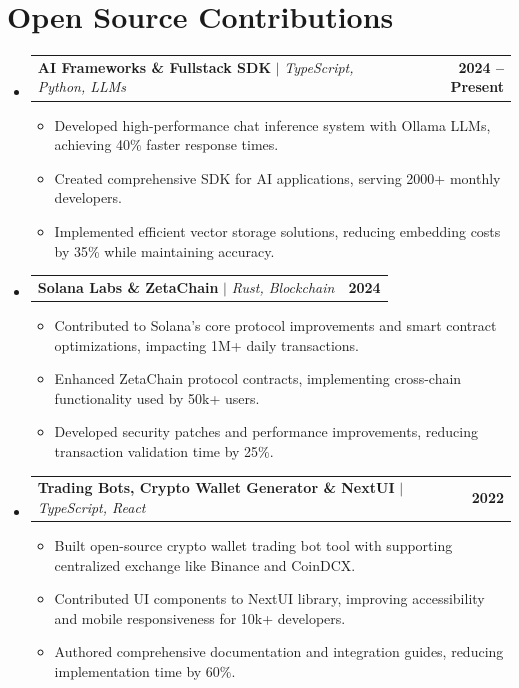 \documentclass[letterpaper,11pt]{article}
\makeatletter
\newcommand{\resumeItem}[1]{
  \item\small{
    {#1 \vspace{-2pt}}
  }
}
\newcommand{\resumeProjectHeading}[2]{
    \item
    \begin{tabular*}{1.001\textwidth}{l@{\extracolsep{\fill}}r}
      \small#1 & \textbf{\small #2}\\
    \end{tabular*}\vspace{-7pt}
}
\newcommand{\resumeSubHeadingListStart}{\begin{itemize}[leftmargin=0.0in, label={}]}
\newcommand{\resumeSubHeadingListEnd}{\end{itemize}}
\newcommand{\resumeItemListStart}{\begin{itemize}}
\newcommand{\resumeItemListEnd}{\end{itemize}\vspace{-5pt}}
\makeatother
\begin{document}
\section{Open Source Contributions}
    \vspace{-5pt}
    \resumeSubHeadingListStart
      \resumeProjectHeading
          {\textbf{AI Frameworks \& Fullstack SDK} $|$ \emph{TypeScript, Python, LLMs}}{2024 -- Present}
          \resumeItemListStart
            \resumeItem{Developed high-performance chat inference system with Ollama LLMs, achieving 40\% faster response times.}
            \resumeItem{Created comprehensive SDK for AI applications, serving 2000+ monthly developers.}
            \resumeItem{Implemented efficient vector storage solutions, reducing embedding costs by 35\% while maintaining accuracy.}
          \resumeItemListEnd
          \vspace{-13pt}
      \resumeProjectHeading
          {\textbf{Solana Labs \& ZetaChain} $|$ \emph{Rust, Blockchain}}{2024}
          \resumeItemListStart
            \resumeItem{Contributed to Solana's core protocol improvements and smart contract optimizations, impacting 1M+ daily transactions.}
            \resumeItem{Enhanced ZetaChain protocol contracts, implementing cross-chain functionality used by 50k+ users.}
            \resumeItem{Developed security patches and performance improvements, reducing transaction validation time by 25\%.}
          \resumeItemListEnd
          \vspace{-13pt}
      \resumeProjectHeading
          {\textbf{Trading Bots, Crypto Wallet Generator \& NextUI} $|$ \emph{TypeScript, React}}{2022}
          \resumeItemListStart
            \resumeItem{Built open-source crypto wallet trading bot tool with supporting centralized exchange like Binance and CoinDCX.}
            \resumeItem{Contributed UI components to NextUI library, improving accessibility and mobile responsiveness for 10k+ developers.}
            \resumeItem{Authored comprehensive documentation and integration guides, reducing implementation time by 60\%.}
          \resumeItemListEnd 
    \resumeSubHeadingListEnd
\vspace{-15pt}

\end{document}

